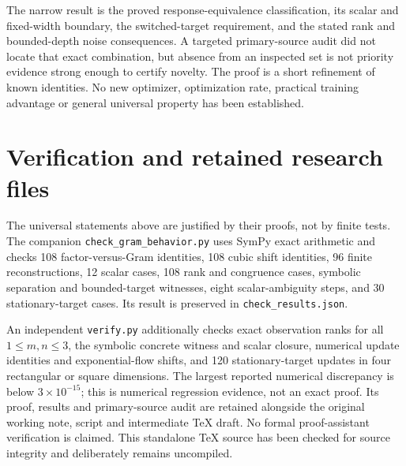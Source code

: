 \documentclass[11pt]{article}
\theoremstyle{remark}\newtheorem{remark}[theorem]{Remark}
\begin{document}
The narrow result is the proved response-equivalence classification,
its scalar and fixed-width boundary, the switched-target requirement,
and the stated rank and bounded-depth noise consequences. A targeted
primary-source audit did not locate that exact combination, but absence
from an inspected set is not priority evidence strong enough to certify
novelty. The proof is a short refinement of known identities. No new
optimizer, optimization rate, practical training advantage or general
universal property has been established.

\section{Verification and retained research files}
The universal statements above are justified by their proofs, not by
finite tests. The companion \texttt{check\_gram\_behavior.py} uses
SymPy exact arithmetic and checks 108 factor-versus-Gram identities,
108 cubic shift identities, 96 finite reconstructions, 12 scalar cases,
108 rank and congruence cases, symbolic separation and bounded-target
witnesses, eight scalar-ambiguity steps, and 30 stationary-target cases.
Its result is preserved in \texttt{check\_results.json}.

An independent \texttt{verify.py} additionally checks exact observation
ranks for all $1\leq m,n\leq3$, the symbolic concrete witness and scalar
closure, numerical update identities and exponential-flow shifts, and
120 stationary-target updates in four rectangular or square dimensions.
The largest reported numerical discrepancy is below $3\times10^{-15}$;
this is numerical regression evidence, not an exact proof.
Its proof, results and primary-source audit are retained alongside the
original working note, script and intermediate TeX draft. No formal
proof-assistant verification is claimed. This standalone TeX source has
been checked for source integrity and deliberately remains uncompiled.
\end{document}
